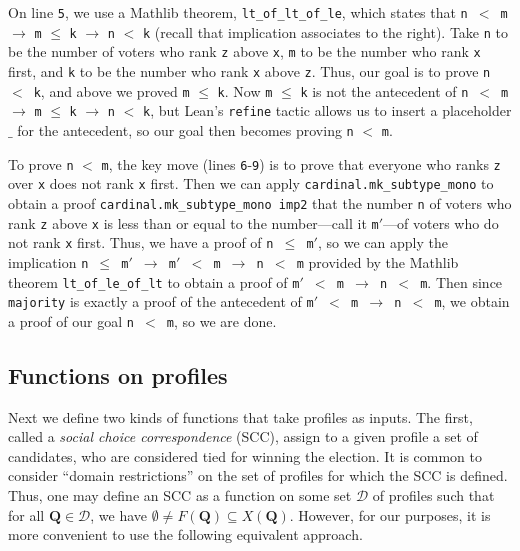 \documentclass[runningheads]{llncs}
\begin{document}
On line \texttt{5}, we use a Mathlib theorem, \texttt{lt\_of\_lt\_of\_le}, which states that \texttt{n}~$<$~\texttt{m} $\to$ \texttt{m} $\leq$ \texttt{k} $\to$ \texttt{n} $<$ \texttt{k} (recall that implication associates to the right). Take \texttt{n} to be the number of voters who rank \texttt{z} above \texttt{x}, \texttt{m} to be the number who rank \texttt{x} first, and \texttt{k} to be the number  who rank \texttt{x} above \texttt{z}. Thus, our goal is to prove \texttt{n}~$<$~\texttt{k}, and above we proved  \texttt{m} $\leq$ \texttt{k}. Now \texttt{m} $\leq$ \texttt{k} is not the antecedent of \texttt{n}~$<$~\texttt{m} $\to$ \texttt{m} $\leq$ \texttt{k} $\to$ \texttt{n} $<$ \texttt{k}, but Lean's \texttt{refine} tactic allows us to insert a placeholder $\_$ for the antecedent, so our goal then becomes proving  \texttt{n} $<$ \texttt{m}. 

To prove \texttt{n} $<$ \texttt{m}, the key move (lines \texttt{6}-\texttt{9}) is to prove that everyone who ranks \texttt{z} over \texttt{x} does not rank \texttt{x} first. Then we can apply \texttt{cardinal.mk\_subtype\_mono} to obtain a proof \texttt{cardinal.mk\_subtype\_mono imp2} that the number \texttt{n} of voters who rank \texttt{z} above \texttt{x} is less than or equal to the number---call it \texttt{m}$'$---of voters who do not rank \texttt{x} first. Thus, we have a proof of \texttt{n~$\leq$~m$'$}, so we can apply the implication  \texttt{n~$\leq$~m$'$ $\to$ m$'$  $<$ m $\to$ n $<$ m} provided by the Mathlib theorem \texttt{lt\_of\_le\_of\_lt} to obtain a proof of \texttt{m$'$  $<$ m $\to$ n $<$ m}. Then since \texttt{majority} is exactly a proof of the antecedent of \texttt{m$'$  $<$ m $\to$ n $<$ m}, we obtain a proof of our goal \texttt{n $<$ m}, so we are done.




\subsection{Functions on profiles}

Next we define two kinds of functions that take profiles as inputs. The first, called a \textit{social choice correspondence} (SCC), assign to a given profile a set of candidates, who are considered tied for winning the election. It is common to consider ``domain restrictions'' on the set of profiles for which the SCC is defined. Thus, one may define an SCC as a function on some set $\mathcal{D}$ of profiles such that for all $\mathbf{Q}\in\mathcal{D}$, we have ${\emptyset\neq F(\mathbf{Q})\subseteq X(\mathbf{Q})}$. However, for our purposes, it is more convenient to use the following equivalent approach.
\end{document}
